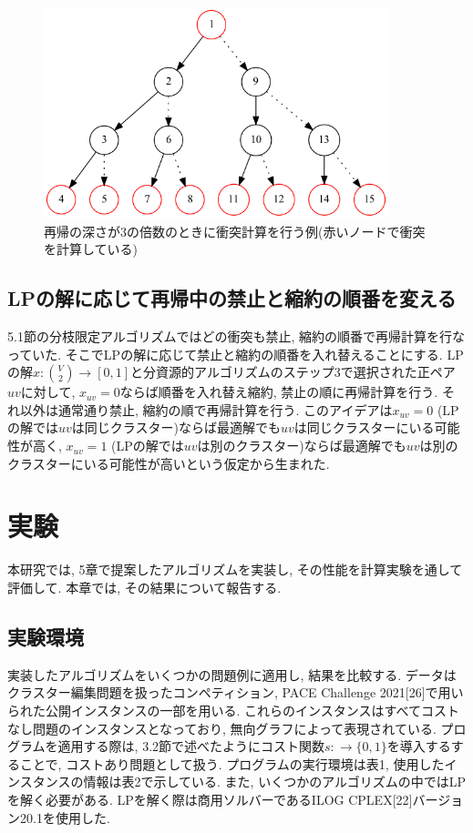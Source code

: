 \documentclass[10.5,a4paper,titlepage, dvipdfmx]{bxjsarticle}
\begin{document}
\begin{figure}[H]
    \begin{center}
    \includegraphics[width=10cm]{tree.png}
    \caption{再帰の深さが3の倍数のときに衝突計算を行う例(赤いノードで衝突を計算している)}
\end{center}
\end{figure}

\subsection{LPの解に応じて再帰中の禁止と縮約の順番を変える}
5.1節の分枝限定アルゴリズムではどの衝突も禁止, 縮約の順番で再帰計算を行なっていた.
そこでLPの解に応じて禁止と縮約の順番を入れ替えることにする.
LPの解$x:\binom{V}{2} \rightarrow [0,1]$と分資源的アルゴリズムのステップ3で選択された正ペア$uv$に対して, $x_{uv}=0$ならば順番を入れ替え縮約, 禁止の順に再帰計算を行う.
それ以外は通常通り禁止, 縮約の順で再帰計算を行う.
このアイデアは$x_{uv}=0$ (LPの解では$uv$は同じクラスター)ならば最適解でも$uv$は同じクラスターにいる可能性が高く,
$x_{uv}=1$ (LPの解では$uv$は別のクラスター)ならば最適解でも$uv$は別のクラスターにいる可能性が高いという仮定から生まれた.


\section{実験}
本研究では, 5章で提案したアルゴリズムを実装し, その性能を計算実験を通して評価して.
本章では, その結果について報告する.
\subsection{実験環境}
実装したアルゴリズムをいくつかの問題例に適用し, 結果を比較する.
データはクラスター編集問題を扱ったコンペティション, PACE Challenge 2021[26]で用いられた公開インスタンスの一部を用いる.
これらのインスタンスはすべてコストなし問題のインスタンスとなっており, 無向グラフによって表現されている.
プログラムを適用する際は, 3.2節で述べたようにコスト関数$s: \rightarrow \{0,1\}$を導入するすることで, コストあり問題として扱う.
プログラムの実行環境は表1, 使用したインスタンスの情報は表2で示している.
また, いくつかのアルゴリズムの中ではLPを解く必要がある.
LPを解く際は商用ソルバーであるILOG CPLEX[22]バージョン20.1を使用した.
\end{document}
